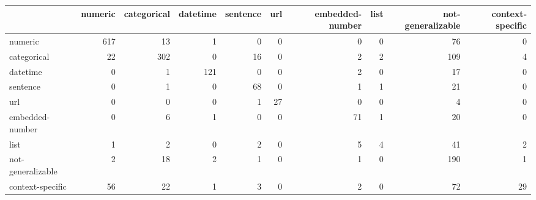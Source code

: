 \begin{tabular}{lrrrrrrrrr}
\toprule
{} &  numeric &  categorical &  datetime &  sentence &  url &  embedded-number &  list &  not-generalizable &  context-specific \\
\midrule
numeric           &      617 &           13 &         1 &         0 &    0 &                0 &     0 &                 76 &                 0 \\
categorical       &       22 &          302 &         0 &        16 &    0 &                2 &     2 &                109 &                 4 \\
datetime          &        0 &            1 &       121 &         0 &    0 &                2 &     0 &                 17 &                 0 \\
sentence          &        0 &            1 &         0 &        68 &    0 &                1 &     1 &                 21 &                 0 \\
url               &        0 &            0 &         0 &         1 &   27 &                0 &     0 &                  4 &                 0 \\
embedded-number   &        0 &            6 &         1 &         0 &    0 &               71 &     1 &                 20 &                 0 \\
list              &        1 &            2 &         0 &         2 &    0 &                5 &     4 &                 41 &                 2 \\
not-generalizable &        2 &           18 &         2 &         1 &    0 &                1 &     0 &                190 &                 1 \\
context-specific  &       56 &           22 &         1 &         3 &    0 &                2 &     0 &                 72 &                29 \\
\bottomrule
\end{tabular}
